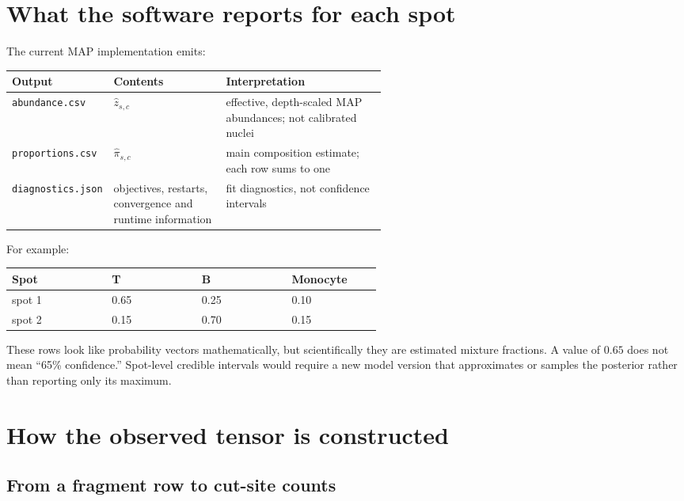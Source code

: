 \documentclass[11pt]{article}
\begin{document}
\section{What the software reports for each spot}

The current MAP implementation emits:

\begin{center}
\begin{tabularx}{0.94\linewidth}{L{0.25\linewidth}L{0.30\linewidth}X}
\toprule
Output & Contents & Interpretation \\
\midrule
\texttt{abundance.csv} & \(\widehat z_{s,c}\) & effective, depth-scaled MAP abundances; not calibrated nuclei \\
\texttt{proportions.csv} & \(\widehat\pi_{s,c}\) & main composition estimate; each row sums to one \\
\texttt{diagnostics.json} & objectives, restarts, convergence and runtime information & fit diagnostics, not confidence intervals \\
\bottomrule
\end{tabularx}
\end{center}

For example:

\begin{center}
\begin{tabular}{L{0.20\linewidth}C{0.18\linewidth}C{0.18\linewidth}C{0.18\linewidth}}
\toprule
Spot & T & B & Monocyte \\
\midrule
spot 1 & 0.65 & 0.25 & 0.10 \\
spot 2 & 0.15 & 0.70 & 0.15 \\
\bottomrule
\end{tabular}
\end{center}

These rows look like probability vectors mathematically, but scientifically they
are estimated mixture fractions. A value of \(0.65\) does not mean “65\%
confidence.” Spot-level credible intervals would require a new model version that
approximates or samples the posterior rather than reporting only its maximum.

\section{How the observed tensor is constructed}

\subsection{From a fragment row to cut-site counts}
\end{document}
